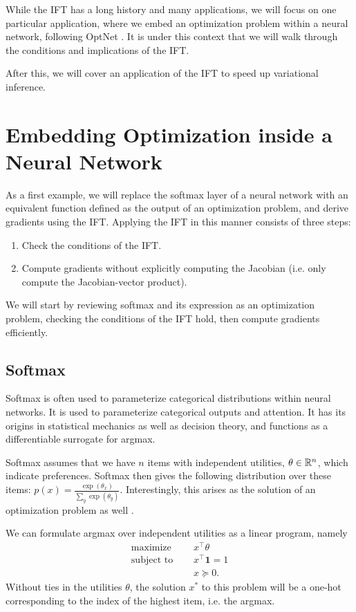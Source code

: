 \documentclass[11pt]{article}
\begin{document}
While the IFT has a long history and many applications, we will focus on one particular application,
where we embed an optimization problem within a neural network,
following OptNet \citep{optnet}.
It is under this context that we will walk through the conditions and implications of the IFT.

After this, we will cover an application of the IFT to speed up variational inference.

\section{Embedding Optimization inside a Neural Network}
As a first example, we will replace the softmax layer of a neural network with an equivalent function
defined as the output of an optimization problem, and derive gradients using the IFT.
Applying the IFT in this manner consists of three steps:
\begin{enumerate}
\item Check the conditions of the IFT.
\item Compute gradients without explicitly computing the Jacobian
    (i.e. only compute the Jacobian-vector product).
\end{enumerate}

We will start by reviewing softmax and its expression as an optimization problem,
checking the conditions of the IFT hold, then compute gradients efficiently.

\subsection{Softmax}
Softmax is often used to parameterize categorical distributions within neural networks.
It is used to parameterize categorical outputs and attention.
It has its origins in statistical mechanics as well as decision theory, and functions
as a differentiable surrogate for argmax.

Softmax assumes that we have $n$ items with independent utilities, $\theta \in \mathbb{R}^n$,
which indicate preferences.
Softmax then gives the following distribution over these items:
$p(x) = \frac{\exp(\theta_x)}{\sum_y \exp(\theta_y)}$.
Interestingly, this arises as the solution of an optimization problem as well \citep{gao2018properties}.

We can formulate argmax over independent utilities as a linear program, namely
\begin{equation}
\begin{aligned}
\textrm{maximize } \quad & x^\top\theta\\
\textrm{subject to } \quad & x^\top \mathbf{1} = 1\\
& x \succeq 0.
\end{aligned}
\end{equation}
Without ties in the utilities $\theta$, the solution $x^*$ to this problem will be a
one-hot corresponding to the index of the highest item, i.e. the argmax.
\end{document}
